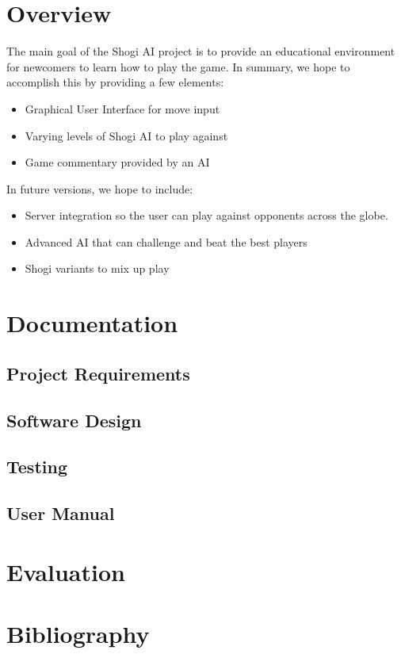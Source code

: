 \documentclass[letterpaper,12pt]{article}
\begin{document}
\section{Overview}
The main goal of the Shogi AI project is to provide an educational environment for newcomers to learn how to play the game. In summary, we hope to accomplish this by providing a few elements:
\begin{itemize}
 \item Graphical User Interface for move input
 \item Varying levels of Shogi AI to play against
 \item Game commentary provided by an AI
\end{itemize}
In future versions, we hope to include:
\begin{itemize}
 \item Server integration so the user can play against opponents across the globe.
 \item Advanced AI that can challenge and beat the best players
 \item Shogi variants to mix up play
\end{itemize}

\newpage

\section{Documentation}

\subsection{Project Requirements}

\subsection{Software Design}

\subsection{Testing}

\subsection{User Manual}

\section{Evaluation}

\section{Bibliography}
\end{document}
